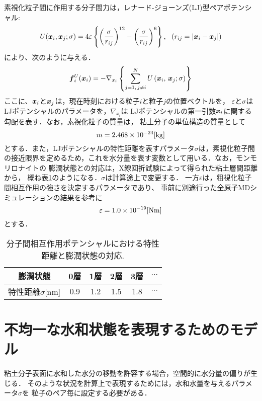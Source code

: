 素視化粒子間に作用する分子間力は，レナード-ジョーンズ(LJ)型ペアポテンシャル:
\begin{equation}
	U(\mbox{\boldmath $x$}_i,\mbox{\boldmath $x$}_j; \sigma) 
	= 4 \varepsilon 
	\left\{ 
	\left(\frac{\sigma}{r_{ij}}\right)^{12}
	-
	\left(\frac{\sigma}{r_{ij}}\right)^6
	\right\}, \ \ \left( r_{ij}=\left| \mbox{\boldmath $x$}_i-\mbox{\boldmath $x$}_j\right| \right)
	\label{eqn:}
\end{equation}
により、次のように与える．
\begin{equation}
	\mbox{\boldmath $f$}_i^U(\mbox{\boldmath $x$}_i)
	=
	-\nabla_{x_i} 
	\left\{ 
		\sum_{j=1, \, j \neq i}^N U\left(\mbox{\boldmath $x$}_i,\,\mbox{\boldmath $x$}_j; \sigma \right)
	\right\}
	\label{eqn:}
\end{equation}
ここに、$\mbox{\boldmath $x$}_i$と$\mbox{\boldmath $x$}_j$は，現在時刻における粒子$i$と粒子$j$の位置ベクトルを，
$\varepsilon$と$\sigma$はLJポテンシャルのパラメータを，$\nabla_{x_i}$は
LJポテンシャルの第一引数$\mbox{\boldmath $x$}_i$に関する勾配を表す．なお，素視化粒子の質量は，
粘土分子の単位構造の質量として
\begin{equation}
	m=2.468\times 10 ^{-24}[{\rm kg}]
\end{equation}
とする．また，LJポテンシャルの特性距離を表すパラメータ$\sigma$は，素視化粒子間
の接近限界を定めるため，これを水分量を表す変数として用いる．なお，モンモリロナイトの
膨潤状態との対応は，X線回折試験によって得られた粘土層間距離から，
概ね表\ref{tbl:tbl_sig}のようになる．$\sigma$は計算途上で変更する．
一方$\varepsilon$は，粗視化粒子間相互作用の強さを決定するパラメータであり、
事前に別途行った全原子MDシミュレーションの結果を参考に
\begin{equation}
	\varepsilon=1.0\times 10^{-19}[{\rm Nm}]
	\label{eqn:}
\end{equation}
とする．
\begin{table}[h]
	\begin{center}
	\caption{分子間相互作用ポテンシャルにおける特性距離と膨潤状態の対応.}
	\vspace{3mm}
	\begin{tabular}{c||c|c|c|c|c}
		膨潤状態 & 0層 & 1層 & 2層 & 3層 & $\cdots$\\
		\hline
		特性距離$\sigma$[{\rm nm}]& 0.9 & 1.2 & 1.5 & 1.8 & $\cdots$ \\
	\end{tabular}
	\label{tbl:tbl_sig}
	\end{center}
\end{table}
\section{不均一な水和状態を表現するためのモデル}
粘土分子表面に水和した水分の移動を許容する場合，空間的に水分量の偏りが生じる．
そのような状況を計算上で表現するためには，水和水量を与えるパラメータ$\sigma$を
粒子のペア毎に設定する必要がある．

